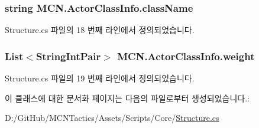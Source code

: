 \subsubsection[{\texorpdfstring{class\+Name}{className}}]{\setlength{\rightskip}{0pt plus 5cm}string M\+C\+N.\+Actor\+Class\+Info.\+class\+Name}\hypertarget{class_m_c_n_1_1_actor_class_info_ae6514ccfb1a131c047d28a612b2e5d7c}{}\label{class_m_c_n_1_1_actor_class_info_ae6514ccfb1a131c047d28a612b2e5d7c}


Structure.\+cs 파일의 18 번째 라인에서 정의되었습니다.

\subsubsection[{\texorpdfstring{weight}{weight}}]{\setlength{\rightskip}{0pt plus 5cm}List$<${\bf String\+Int\+Pair}$>$ M\+C\+N.\+Actor\+Class\+Info.\+weight}\hypertarget{class_m_c_n_1_1_actor_class_info_a65c5ae85a99cc8058149fb567f7c0086}{}\label{class_m_c_n_1_1_actor_class_info_a65c5ae85a99cc8058149fb567f7c0086}


Structure.\+cs 파일의 19 번째 라인에서 정의되었습니다.



이 클래스에 대한 문서화 페이지는 다음의 파일로부터 생성되었습니다.\+:\begin{DoxyCompactItemize}
\item 
D\+:/\+Git\+Hub/\+M\+C\+N\+Tactics/\+Assets/\+Scripts/\+Core/\hyperlink{_structure_8cs}{Structure.\+cs}\end{DoxyCompactItemize}
